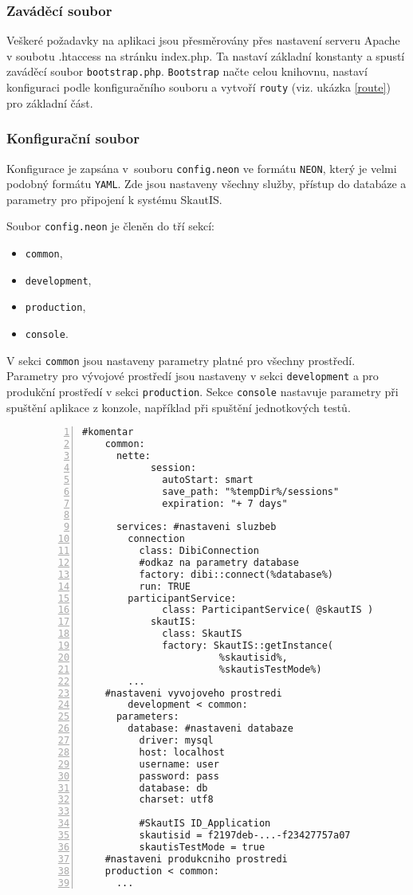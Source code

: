\documentclass[thesis=B,czech]{FITthesis}[2012/04/27]
\begin{document}
\subsubsection{Zaváděcí soubor}
Veškeré požadavky na aplikaci jsou přesměrovány přes nastavení serveru Apache v soubotu .htaccess na stránku index.php. Ta nastaví základní konstanty a spustí zaváděcí soubor \texttt{bootstrap.php}.
\texttt{Bootstrap} načte celou knihovnu, nastaví konfiguraci podle konfiguračního souboru a vytvoří \texttt{routy} (viz. ukázka \ref{route}) pro základní část.

\subsubsection{Konfigurační soubor}
Konfigurace je zapsána v~souboru \texttt{config.neon} ve formátu \texttt{NEON}\cite{neon}, který je velmi podobný formátu \texttt{YAML}. Zde jsou nastaveny všechny služby, přístup do databáze a parametry pro připojení k systému SkautIS.

Soubor \texttt{config.neon} je členěn do tří sekcí:

\begin{itemize}
	\item \texttt{common},
	\item \texttt{development},
	\item \texttt{production},
	\item \texttt{console}.
\end{itemize}

V sekci \texttt{common} jsou nastaveny parametry platné pro všechny prostředí. Parametry pro vývojové prostředí jsou nastaveny v sekci \texttt{development} a pro produkční prostředí v sekci \texttt{production}. Sekce \texttt{console} nastavuje parametry při spuštění aplikace z konzole, například při spuštění jednotkových testů.

\begin{figure}
\begin{lstlisting}[caption=ukázka z konfiguračního souboru config.neon, numbers=left, label=configneon]
	#komentar
	common:
	  nette:
            session:
              autoStart: smart
              save_path: "%tempDir%/sessions"
              expiration: "+ 7 days"
           
	  services: #nastaveni sluzbeb
	    connection
	      class: DibiConnection
	      #odkaz na parametry database
	      factory: dibi::connect(%database%)
	      run: TRUE
	    participantService:
              class: ParticipantService( @skautIS )
            skautIS:
              class: SkautIS
              factory: SkautIS::getInstance(
              			%skautisid%,
              			%skautisTestMode%)
	    ...
	#nastaveni vyvojoveho prostredi
        development < common:	
	  parameters:
	    database: #nastaveni databaze
	      driver: mysql
	      host: localhost
	      username: user
	      password: pass
	      database: db
	      charset: utf8
	
	      #SkautIS ID_Application
	      skautisid = f2197deb-...-f23427757a07
	      skautisTestMode = true
	#nastaveni produkcniho prostredi
	production < common:
	  ...
\end{lstlisting}
\end{figure}
\end{document}
